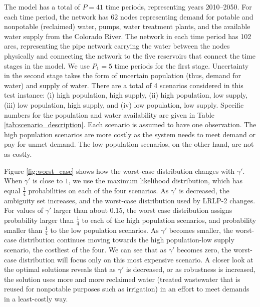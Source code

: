 \documentclass[12pt]{amsart}
\begin{document}
The model has a total of $P = 41$ time periods, representing years 2010--2050. 
For each time period, the network has 62 nodes representing demand for potable and nonpotable (reclaimed) water, pumps, water treatment plants, and the available water supply from the Colorado River.
The network in each time period has 102 arcs, representing the pipe network carrying the water between the nodes physically and connecting the network to the five reservoirs that connect the time stages in the model.
We use $P_1 = 5$ time periods for the first stage.
Uncertainty in the second stage takes the form of uncertain population (thus, demand for water) and supply of water.
There are a total of 4 scenarios considered in this test instance: (i) high population, high supply, (ii) high population, low supply, (iii) low population, high supply, and (iv) low population, low supply.
Specific numbers for the population and water availability are given in Table \ref{tab:scenario_description}.
Each scenario is assumed to have one observation.
The high population scenarios are more costly as the system needs to meet demand or pay for unmet demand.
The low population scenarios, on the other hand, are not as costly. 

Figure \ref{fig:worst_case} shows how the worst-case distribution changes with $\gamma'$.
When $\gamma'$ is close to $1$, we use the maximum likelihood distribution, which has equal $\tfrac{1}{4}$ probabilities on each of the four scenarios.
As $\gamma'$ is decreased, the ambiguity set increases, and the worst-case distribution used by LRLP-2 changes.
For values of $\gamma'$ larger than about $0.15$, the worst case distribution assigns probability larger than $\tfrac{1}{4}$ to each of the high population scenarios, and probability smaller than $\tfrac{1}{4}$ to the low population scenarios.
As $\gamma'$ becomes smaller, the worst-case distribution continues moving towards the high population-low supply scenario, the costliest of the four.
We can see that as $\gamma'$ becomes zero, the worst-case distribution will focus only on this most expensive scenario.
A closer look at the optimal solutions reveals that as $\gamma'$ is decreased, or as robustness is increased, the solution uses more and more reclaimed water (treated wastewater that is reused for nonpotable purposes such as irrigation) in an effort to meet demands in a least-costly way.
\end{document}
